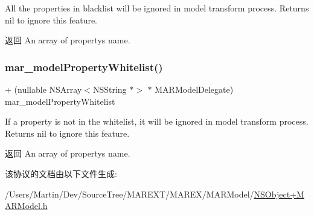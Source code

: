 All the properties in blacklist will be ignored in model transform process. Returns nil to ignore this feature.

\begin{DoxyReturn}{返回}
An array of property\textquotesingle{}s name. 
\end{DoxyReturn}
\mbox{\label{protocol_m_a_r_model_delegate_01-p_adbc740518f96ea62f9d99104dcaa449c}} 
\subsubsection{\texorpdfstring{mar\+\_\+model\+Property\+Whitelist()}{mar\_modelPropertyWhitelist()}}
{\footnotesize\ttfamily + (nullable N\+S\+Array$<$N\+S\+String $\ast$$>$ $\ast$ M\+A\+R\+Model\+Delegate) mar\+\_\+model\+Property\+Whitelist \begin{DoxyParamCaption}{ }\end{DoxyParamCaption}}

If a property is not in the whitelist, it will be ignored in model transform process. Returns nil to ignore this feature.

\begin{DoxyReturn}{返回}
An array of property\textquotesingle{}s name. 
\end{DoxyReturn}


该协议的文档由以下文件生成\+:\begin{DoxyCompactItemize}
\item 
/\+Users/\+Martin/\+Dev/\+Source\+Tree/\+M\+A\+R\+E\+X\+T/\+M\+A\+R\+E\+X/\+M\+A\+R\+Model/\hyperlink{_n_s_object_09_m_a_r_model_8h}{N\+S\+Object+\+M\+A\+R\+Model.\+h}\end{DoxyCompactItemize}
